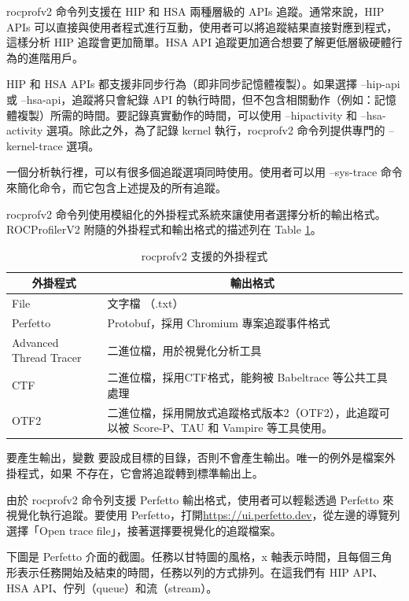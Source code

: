 rocprofv2 命令列支援在 HIP 和 HSA 兩種層級的 APIs 追蹤。通常來說，HIP APIs 可以直接與使用者程式進行互動，使用者可以將追蹤結果直接對應到程式，這樣分析 HIP 追蹤會更加簡單。HSA API 追蹤更加適合想要了解更低層級硬體行為的進階用戶。

HIP 和 HSA APIs 都支援非同步行為（即非同步記憶體複製）。如果選擇 –hip-api 或 –hsa-api，追蹤將只會紀錄 API 的執行時間，但不包含相關動作（例如：記憶體複製）所需的時間。要記錄真實動作的時間，可以使用 –hipactivity 和 –hsa-activity 選項。除此之外，為了記錄 kernel 執行，rocprofv2 命令列提供專門的 –kernel-trace 選項。

一個分析執行裡，可以有很多個追蹤選項同時使用。使用者可以用 –sys-trace 命令來簡化命令，而它包含上述提及的所有追蹤。

rocprofv2 命令列使用模組化的外掛程式系統來讓使用者選擇分析的輸出格式。ROCProfilerV2 附隨的外掛程式和輸出格式的描述列在 Table \ref{tab:plugins}。

\begin{table}[htbp]
    \centering
    \begin{tabular}{p{4cm}p{10cm}}
        \toprule
        \multicolumn{1}{c}{外掛程式} &
        \multicolumn{1}{c}{輸出格式} \\
        \midrule
        File & 文字檔 （.txt） \\
        Perfetto & Protobuf，採用 Chromium 專案追蹤事件格式 \\
        Advanced Thread Tracer &  二進位檔，用於視覺化分析工具 \\
        CTF & 二進位檔，採用CTF格式，能夠被 Babeltrace 等公共工具處理 \\
        OTF2 & 二進位檔，採用開放式追蹤格式版本2（OTF2），此追蹤可以被 Score-P、TAU 和 Vampire 等工具使用。 \\
        \bottomrule
    \end{tabular}
    \caption{rocprofv2 支援的外掛程式}
    \label{tab:plugins}
\end{table}

要產生輸出，變數  要設成目標的目錄，否則不會產生輸出。唯一的例外是檔案外掛程式，如果  不存在，它會將追蹤轉到標準輸出上。

由於 rocprofv2 命令列支援 Perfetto 輸出格式，使用者可以輕鬆透過 Perfetto 來視覺化執行追蹤。要使用 Perfetto，打開\url{https://ui.perfetto.dev}，從左邊的導覽列選擇「Open trace file」，接著選擇要視覺化的追蹤檔案。

下圖是 Perfetto 介面的截圖。任務以甘特圖的風格，x 軸表示時間，且每個三角形表示任務開始及結束的時間，任務以列的方式排列。在這我們有 HIP API、HSA API、佇列（queue）和流（stream）。

